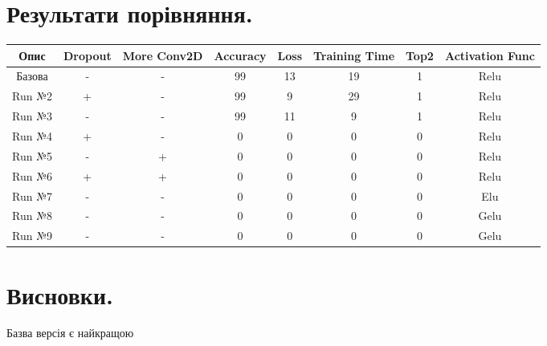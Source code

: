 \documentclass{article}
\begin{document}
    \section{Результати порівняння.}
    \begin{table}[h!]
        \begin{tabular}{| c | c | c | c | c | c | c | c |}
            \hline
            Опис & Dropout & More Conv2D & Accuracy & Loss & Training Time & Top2 & Activation Func \\
            \hline
            Базова & - & - & 99 & 13 & 19 & 1 & Relu \\
            \hline
            Run №2 & + & - & 99 & 9 & 29 & 1 & Relu \\
            \hline
            Run №3 & - & - & 99 & 11 & 9 & 1 & Relu \\
            \hline
            Run №4 & + & - & 0 & 0 & 0 & 0 & Relu \\
            \hline
            Run №5 & - & + & 0 & 0 & 0 & 0 & Relu \\
            \hline
            Run №6 & + & + & 0 & 0 & 0 & 0 & Relu \\
            \hline
            Run №7 & - & - & 0 & 0 & 0 & 0 & Elu \\
            \hline
            Run №8 & - & - & 0 & 0 & 0 & 0 & Gelu \\
            \hline
            Run №9 & - & - & 0 & 0 & 0 & 0 & Gelu \\
            \hline
        \end{tabular}
    \end{table}

    \section{Висновки.}
    Базва версія є найкращою
\end{document}

